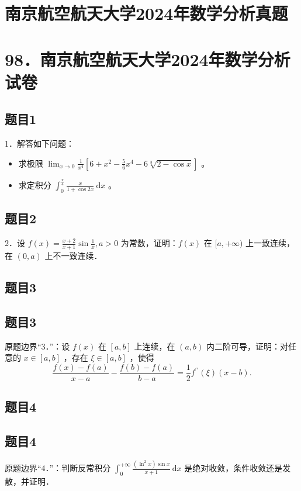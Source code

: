 \documentclass{article}
\begin{document}
\section*{南京航空航天大学2024年数学分析真题}
\section*{98．南京航空航天大学2024年数学分析试卷}

\subsection{题目1}
1．解答如下问题：

\begin{itemize}
  \item[（1）] 求极限 \(\lim _{x \rightarrow 0} \frac{1}{x^{4}}\left[6+x^{2}-\frac{5}{6} x^{4}-6 \sqrt[3]{2-\cos x}\right]\) 。
  \item[（2）] 求定积分 \(\int_{0}^{\frac{\pi}{4}} \frac{x}{1+\cos 2 x} \mathrm{~d} x\) 。
\end{itemize}

\subsection{题目2}
2．设 \(f(x)=\frac{x+2}{x+1} \sin \frac{1}{x}, a>0\) 为常数，证明：\(f(x)\) 在 \([a,+\infty)\) 上一致连续，在 \((0, a)\) 上不一致连续．

\begin{itemize}

\subsection{题目3}
\end{itemize}

\subsection{题目3}
原题边界“3．”：设 \(f(x)\) 在 \([a, b]\) 上连续，在 \((a, b)\) 内二阶可导，证明：对任意的 \(x \in[a, b]\) ，存在 \(\xi \in[a, b]\) ，使得
\[
\frac{f(x)-f(a)}{x-a}-\frac{f(b)-f(a)}{b-a}=\frac{1}{2} f^{\prime \prime}(\xi)(x-b) .
\]

\subsection{题目4}

\subsection{题目4}
原题边界“4．”：判断反常积分 \(\int_{0}^{+\infty} \frac{\left(\ln ^{2} x\right) \sin x}{x+1} \mathrm{~d} x\) 是绝对收敛，条件收敛还是发散，并证明．
\end{document}
